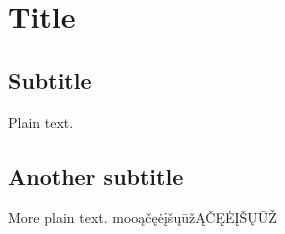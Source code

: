 \documentclass{article}
\begin{document}
\section{Title}

\subsection{Subtitle}

Plain text.

\subsection{Another subtitle}

More plain text. mooąčęėįšųūžĄČĘĖĮŠŲŪŽ
\end{document}
